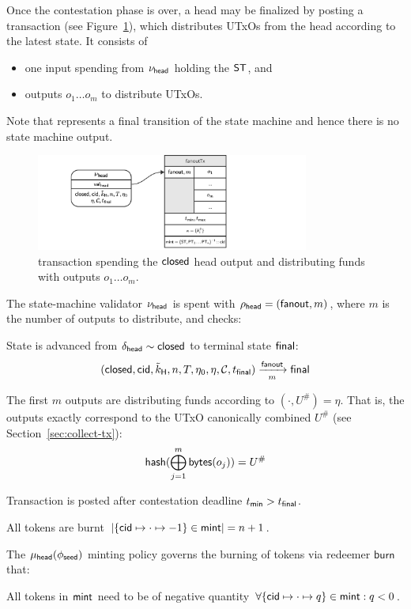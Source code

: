 Once the contestation phase is over, a head may be finalized by posting a
\mtxFanout{} transaction (see Figure~\ref{fig:fanoutTx}), which
distributes UTxOs from the head according to the latest state. It consists of
\begin{itemize}
	\item one input spending from $\nu_\mathsf{head}$ holding the $\mathsf{ST}$, and
	\item outputs $o_{1} \dots o_{m}$ to distribute UTxOs.
\end{itemize}

Note that \mtxFanout{} represents a final transition of the state machine and
hence there is no state machine output.

\begin{figure}[h]
	\centering
	\includegraphics[width=0.8\textwidth]{figures/fanoutTx.pdf}
	\caption{\mtxFanout{} transaction spending the $\mathsf{closed}$ head output and
		distributing funds with outputs $o_{1} \dots o_{m}$.}\label{fig:fanoutTx}
\end{figure}

\noindent The state-machine validator $\nu_\mathsf{head}$ is spent with
$\rho_{\mathsf{head}} = (\mathsf{fanout}, m)$, where $m$ is the number of outputs to
distribute, and checks:
\begin{menumerate}
	\item State is advanced from $\delta_{\mathsf{head}} \sim \mathsf{closed}$ to terminal state
	$\mathsf{final}$: %
	\[
		(\mathsf{closed},\mathsf{cid},\tilde{k}_{\mathsf{H}},n,T,\eta_0,\eta,\mathcal{C},t_{\mathsf{final}}) \xrightarrow[m]{\mathsf{fanout}} \mathsf{final}
	\]
	\item The first $m$ outputs are distributing funds according to
	$(\cdot, U^{\#}) = \eta$. That is, the outputs exactly correspond to the UTxO
	canonically combined $U^{\#}$ (see Section~\ref{sec:collect-tx}):
	\[
		\mathsf{hash}(\bigoplus_{j=1}^{m} \mathsf{bytes}(o_{j})) = U^{\#}
	\]
	\item Transaction is posted after contestation deadline $t_{\mathsf{min}} > t_{\mathsf{final}}$.
	\item All tokens are burnt
	$|\{\mathsf{cid} \mapsto \cdot \mapsto -1\} \in \mathsf{mint}| = n + 1$.
\end{menumerate}

\noindent The $\mu_\mathsf{head}(\phi_{\mathsf{seed}})$ minting policy governs the burning of tokens via
redeemer $\mathsf{burn}$ that:
\begin{menumerate}
	\item All tokens in $\mathsf{mint}$ need to be of negative quantity
	$\forall \{\mathsf{cid} \mapsto \cdot \mapsto q\} \in \mathsf{mint} : q < 0$.
\end{menumerate}

\FloatBarrier{}


